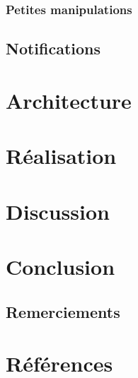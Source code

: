 \documentclass[a4paper, 12pt]{article}
\begin{document}
\subsubsection{Petites manipulations}

\subsection{Notifications}



\section{Architecture} %


\section{Réalisation} %



\section{Discussion} %



\section{Conclusion} %
\subsection{Remerciements}


\newpage
\section{Références} %


\end{document}
